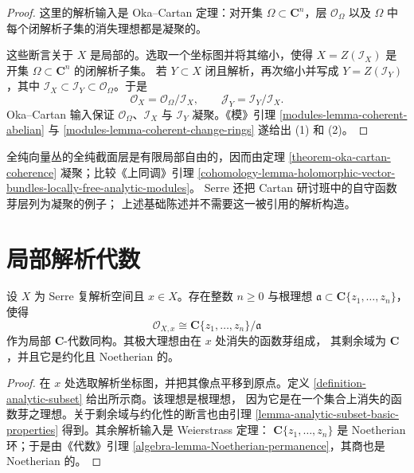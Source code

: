 \begin{proof}
这里的解析输入是 Oka--Cartan 定理：对开集
$\Omega\subset\mathbf C^n$，层 $\mathcal O_\Omega$ 以及
$\Omega$ 中每个闭解析子集的消失理想都是凝聚的。

这些断言关于 $X$ 是局部的。选取一个坐标图并将其缩小，使得
$X=Z(\mathcal I_X)$ 是开集 $\Omega\subset\mathbf C^n$ 的闭解析子集。
若 $Y\subset X$ 闭且解析，再次缩小并写成 $Y=Z(\mathcal I_Y)$，其中
$\mathcal I_X\subset\mathcal I_Y\subset\mathcal O_\Omega$。于是
$$
\mathcal O_X=\mathcal O_\Omega/\mathcal I_X,
\qquad
\mathcal J_Y=\mathcal I_Y/\mathcal I_X.
$$
Oka--Cartan 输入保证 $\mathcal O_\Omega$、$\mathcal I_X$ 与
$\mathcal I_Y$ 凝聚。《模》引理 \ref{modules-lemma-coherent-abelian}
与 \ref{modules-lemma-coherent-change-rings} 遂给出 (1) 和 (2)。
\end{proof}

\begin{remark}[例子]
\label{remark-examples-coherent-analytic-modules}
全纯向量丛的全纯截面层是有限局部自由的，因而由定理
\ref{theorem-oka-cartan-coherence} 凝聚；比较《上同调》引理
\ref{cohomology-lemma-holomorphic-vector-bundles-locally-free-analytic-modules}。
Serre 还把 Cartan 研讨班中的自守函数芽层列为凝聚的例子；
上述基础陈述并不需要这一被引用的解析构造。
\end{remark}


\section{局部解析代数}
\label{section-local-analytic-algebras}

\begin{lemma}
\label{lemma-local-analytic-algebra}
\begin{reference}
\cite[\S 1，第 4 号，第 6 页]{GAGA}
\end{reference}
设 $X$ 为 Serre 复解析空间且 $x\in X$。存在整数 $n\geq 0$ 与根理想
$\mathfrak a\subset\mathbf C\{z_1,\ldots,z_n\}$，使得
$$
\mathcal O_{X,x}\cong
\mathbf C\{z_1,\ldots,z_n\}/\mathfrak a
$$
作为局部 $\mathbf C$-代数同构。其极大理想由在 $x$ 处消失的函数芽组成，
其剩余域为 $\mathbf C$，并且它是约化且 Noetherian 的。
\end{lemma}

\begin{proof}
在 $x$ 处选取解析坐标图，并把其像点平移到原点。定义
\ref{definition-analytic-subset} 给出所示商。该理想是根理想，
因为它是在一个集合上消失的函数芽之理想。关于剩余域与约化性的断言也由引理
\ref{lemma-analytic-subset-basic-properties} 得到。其余解析输入是 Weierstrass 定理：
$\mathbf C\{z_1,\ldots,z_n\}$ 是 Noetherian 环；于是由《代数》引理
\ref{algebra-lemma-Noetherian-permanence}，其商也是 Noetherian 的。
\end{proof}

